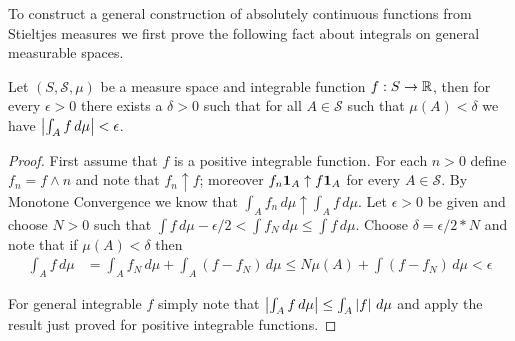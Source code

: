 To construct a general construction of absolutely continuous functions
from Stieltjes measures we first prove the
following fact about integrals on general measurable spaces.

\begin{lem}\label{LimitOfIntegralAsMeasureGoesToZero}Let $(S, \mathcal{S}, \mu)$ be a measure space and
  integrable function $f:S \to \mathbb{R}$, then for
  every $\epsilon>0$ there exists a $\delta>0$ such that for all $A
  \in \mathcal{S}$ such that $\mu(A) < \delta$ we have $\left \vert \int_A f\,
  d\mu \right \vert < \epsilon$.
\end{lem}
\begin{proof}
First assume that $f$ is a positive integrable function.  For each $n
> 0$ define $f_n = f \wedge n$ and note that $f_n \uparrow f$;
moreover $f_n \textbf{1}_{A} \uparrow f \textbf{1}_{A}$ for
every $A \in \mathcal{S}$.  By
Monotone Convergence we know that $\int_A f_n \, d\mu \uparrow \int_A
f \, d\mu$.  Let $\epsilon > 0$ be given and choose $N > 0$ such that
$\int f \, d\mu - \epsilon/2 < \int f_N \, d\mu \leq \int f \, d\mu$.
Choose $\delta = \epsilon/2*N$ and note that if $\mu(A) < \delta$ then
\begin{align*}
\int_A f \, d\mu &= \int_A f_N \, d\mu + \int_A (f-f_N) \, d\mu \leq N
\mu(A) + \int (f-f_N) \, d\mu < \epsilon
\end{align*}

For general integrable $f$ simply note that $\left \vert \int_A f \, d\mu \right \vert
\leq \int_A \left \vert f \right \vert \, d\mu$ and apply the result just proved for
positive integrable functions.
\end{proof}

